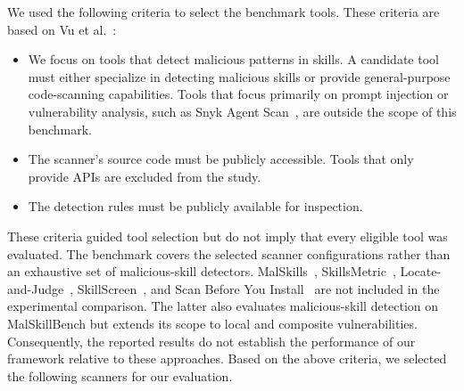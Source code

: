 We used the following criteria to select the benchmark tools. These criteria are based on Vu et al.~\cite{vu2023bad}:
\begin{itemize}
\item We focus on tools that detect malicious patterns in skills. A candidate tool must either specialize in detecting malicious skills or provide general-purpose code-scanning capabilities. Tools that focus primarily on prompt injection or vulnerability analysis, such as Snyk Agent Scan~\cite{snyk}, are outside the scope of this benchmark.
\item The scanner's source code must be publicly accessible. Tools that only provide APIs are excluded from the study.
\item The detection rules must be publicly available for inspection.
\end{itemize}
These criteria guided tool selection but do not imply
that every eligible tool was evaluated.
The benchmark covers the selected scanner configurations
rather than an exhaustive set of malicious-skill detectors.
MalSkills~\cite{wang2026elementary}, SkillsMetric~\cite{chenskillsmetric},
Locate-and-Judge~\cite{etteib2026locatejudge}, SkillScreen~\cite{huang2026skillscreen}, and
Scan Before You Install~\cite{gandhi2026scanbeforeinstall} are not included
in the experimental comparison. The latter also evaluates
malicious-skill detection on MalSkillBench but extends its scope to local and composite
vulnerabilities. Consequently, the reported results do not establish
the performance of our framework relative to these approaches.
Based on the above criteria, we selected the following scanners for our evaluation. 

